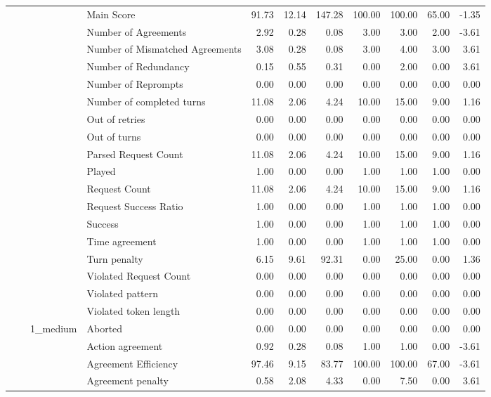 \begin{tabular}{llllrrrrrrr}
 &  &  & Main Score & 91.73 & 12.14 & 147.28 & 100.00 & 100.00 & 65.00 & -1.35 \\
 &  &  & Number of Agreements & 2.92 & 0.28 & 0.08 & 3.00 & 3.00 & 2.00 & -3.61 \\
 &  &  & Number of Mismatched Agreements & 3.08 & 0.28 & 0.08 & 3.00 & 4.00 & 3.00 & 3.61 \\
 &  &  & Number of Redundancy & 0.15 & 0.55 & 0.31 & 0.00 & 2.00 & 0.00 & 3.61 \\
 &  &  & Number of Reprompts & 0.00 & 0.00 & 0.00 & 0.00 & 0.00 & 0.00 & 0.00 \\
 &  &  & Number of completed turns & 11.08 & 2.06 & 4.24 & 10.00 & 15.00 & 9.00 & 1.16 \\
 &  &  & Out of retries & 0.00 & 0.00 & 0.00 & 0.00 & 0.00 & 0.00 & 0.00 \\
 &  &  & Out of turns & 0.00 & 0.00 & 0.00 & 0.00 & 0.00 & 0.00 & 0.00 \\
 &  &  & Parsed Request Count & 11.08 & 2.06 & 4.24 & 10.00 & 15.00 & 9.00 & 1.16 \\
 &  &  & Played & 1.00 & 0.00 & 0.00 & 1.00 & 1.00 & 1.00 & 0.00 \\
 &  &  & Request Count & 11.08 & 2.06 & 4.24 & 10.00 & 15.00 & 9.00 & 1.16 \\
 &  &  & Request Success Ratio & 1.00 & 0.00 & 0.00 & 1.00 & 1.00 & 1.00 & 0.00 \\
 &  &  & Success & 1.00 & 0.00 & 0.00 & 1.00 & 1.00 & 1.00 & 0.00 \\
 &  &  & Time agreement & 1.00 & 0.00 & 0.00 & 1.00 & 1.00 & 1.00 & 0.00 \\
 &  &  & Turn penalty & 6.15 & 9.61 & 92.31 & 0.00 & 25.00 & 0.00 & 1.36 \\
 &  &  & Violated Request Count & 0.00 & 0.00 & 0.00 & 0.00 & 0.00 & 0.00 & 0.00 \\
 &  &  & Violated pattern & 0.00 & 0.00 & 0.00 & 0.00 & 0.00 & 0.00 & 0.00 \\
 &  &  & Violated token length & 0.00 & 0.00 & 0.00 & 0.00 & 0.00 & 0.00 & 0.00 \\
\cline{3-11}
 &  & \multirow[t]{27}{*}{1_medium} & Aborted & 0.00 & 0.00 & 0.00 & 0.00 & 0.00 & 0.00 & 0.00 \\
 &  &  & Action agreement & 0.92 & 0.28 & 0.08 & 1.00 & 1.00 & 0.00 & -3.61 \\
 &  &  & Agreement Efficiency & 97.46 & 9.15 & 83.77 & 100.00 & 100.00 & 67.00 & -3.61 \\
 &  &  & Agreement penalty & 0.58 & 2.08 & 4.33 & 0.00 & 7.50 & 0.00 & 3.61 \\

\end{tabular}
